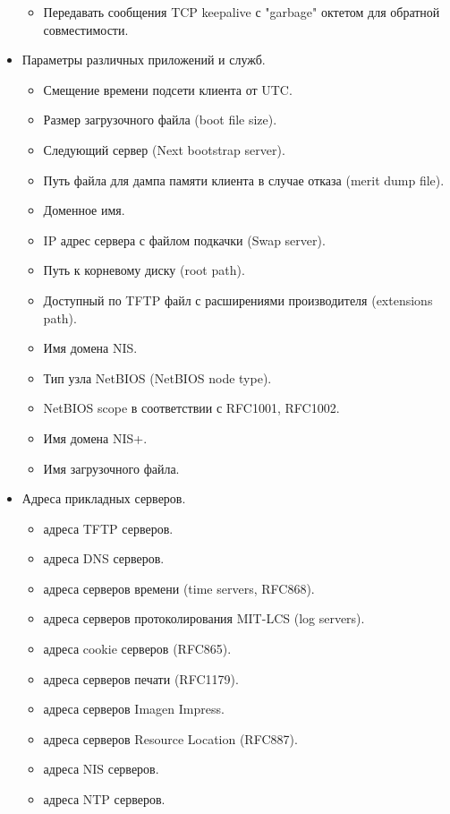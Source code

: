\documentclass[14pt,a4paper]{extarticle}
\begin{document}
\begin{itemize}
\begin{itemize}
        \item Передавать сообщения TCP keepalive с "garbage" октетом для обратной совместимости.
    \end{itemize}
    \item Параметры различных приложений и служб.
    \begin{itemize}
        \item Смещение времени подсети клиента от UTC.
        \item Размер загрузочного файла (boot file size).
        \item Следующий сервер (Next bootstrap server).
        \item Путь файла для дампа памяти клиента в случае отказа (merit dump file).
        \item Доменное имя.
        \item IP адрес сервера с файлом подкачки (Swap server).
        \item Путь к корневому диску (root path).
        \item Доступный по TFTP файл с расширениями производителя (extensions path).
        \item Имя домена NIS.
        \item Тип узла NetBIOS (NetBIOS node type).
        \item NetBIOS scope в соответствии с RFC1001, RFC1002.
        \item Имя домена NIS+.
        \item Имя загрузочного файла.
    \end{itemize}
    \item Адреса прикладных серверов.
    \begin{itemize}
        \item адреса TFTP серверов.
        \item адреса DNS серверов.
        \item адреса серверов времени (time servers, RFC868).
        \item адреса серверов протоколирования MIT-LCS (log servers).
        \item адреса cookie серверов (RFC865).
        \item адреса серверов печати (RFC1179).
        \item адреса серверов Imagen Impress.
        \item адреса серверов Resource Location (RFC887).
        \item адреса NIS серверов.
        \item адреса NTP серверов.

\end{itemize}
\end{itemize}
\end{document}
